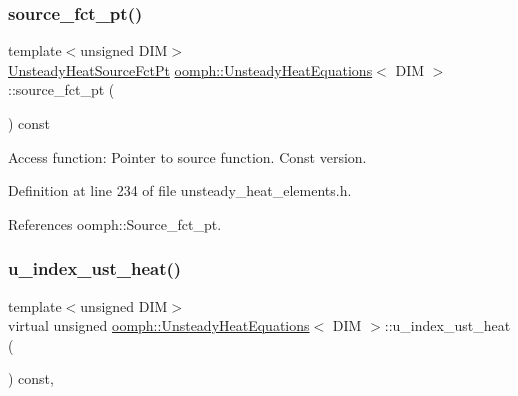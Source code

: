 \subsubsection{\texorpdfstring{source\+\_\+fct\+\_\+pt()}{source\_fct\_pt()}\hspace{0.1cm}{\footnotesize\ttfamily [2/2]}}
{\footnotesize\ttfamily template$<$unsigned D\+IM$>$ \\
\hyperlink{classoomph_1_1UnsteadyHeatEquations_a967135cc2be2cb4b16fe0dc0b4d68a68}{Unsteady\+Heat\+Source\+Fct\+Pt} \hyperlink{classoomph_1_1UnsteadyHeatEquations}{oomph\+::\+Unsteady\+Heat\+Equations}$<$ D\+IM $>$\+::source\+\_\+fct\+\_\+pt (\begin{DoxyParamCaption}{ }\end{DoxyParamCaption}) const\hspace{0.3cm}{\ttfamily [inline]}}



Access function\+: Pointer to source function. Const version. 



Definition at line 234 of file unsteady\+\_\+heat\+\_\+elements.\+h.



References oomph\+::\+Source\+\_\+fct\+\_\+pt.

\mbox{\label{classoomph_1_1UnsteadyHeatEquations_ae8d208c5b107bbdf5b5ef28e33f0b6c6}} 
\subsubsection{\texorpdfstring{u\+\_\+index\+\_\+ust\+\_\+heat()}{u\_index\_ust\_heat()}}
{\footnotesize\ttfamily template$<$unsigned D\+IM$>$ \\
virtual unsigned \hyperlink{classoomph_1_1UnsteadyHeatEquations}{oomph\+::\+Unsteady\+Heat\+Equations}$<$ D\+IM $>$\+::u\+\_\+index\+\_\+ust\+\_\+heat (\begin{DoxyParamCaption}{ }\end{DoxyParamCaption}) const\hspace{0.3cm}{\ttfamily [inline]}, {\ttfamily [virtual]}}



